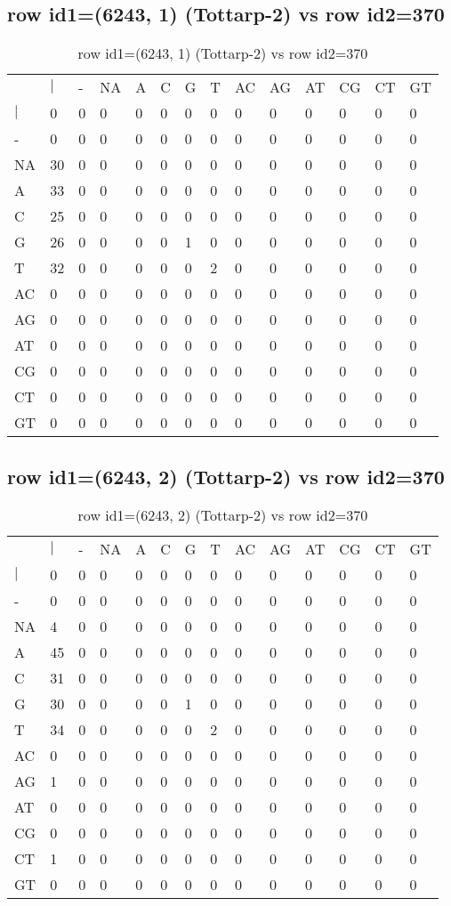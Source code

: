 \subsection{row id1=(6243, 1) (Tottarp-2) vs row id2=370}
\begin{center}
\begin{longtable}{|l|l|l|l|l|l|l|l|l|l|l|l|l|l|}
\caption{row id1=(6243, 1) (Tottarp-2) vs row id2=370} \label{table_dm52}\\
\hline
\\
\hline
&$|$&-&NA&A&C&G&T&AC&AG&AT&CG&CT&GT\\
$|$&0&0&0&0&0&0&0&0&0&0&0&0&0\\
-&0&0&0&0&0&0&0&0&0&0&0&0&0\\
NA&30&0&0&0&0&0&0&0&0&0&0&0&0\\
A&33&0&0&0&0&0&0&0&0&0&0&0&0\\
C&25&0&0&0&0&0&0&0&0&0&0&0&0\\
G&26&0&0&0&0&1&0&0&0&0&0&0&0\\
T&32&0&0&0&0&0&2&0&0&0&0&0&0\\
AC&0&0&0&0&0&0&0&0&0&0&0&0&0\\
AG&0&0&0&0&0&0&0&0&0&0&0&0&0\\
AT&0&0&0&0&0&0&0&0&0&0&0&0&0\\
CG&0&0&0&0&0&0&0&0&0&0&0&0&0\\
CT&0&0&0&0&0&0&0&0&0&0&0&0&0\\
GT&0&0&0&0&0&0&0&0&0&0&0&0&0\\
\hline
\end{longtable}
\end{center}

\subsection{row id1=(6243, 2) (Tottarp-2) vs row id2=370}
\begin{center}
\begin{longtable}{|l|l|l|l|l|l|l|l|l|l|l|l|l|l|}
\caption{row id1=(6243, 2) (Tottarp-2) vs row id2=370} \label{table_dm54}\\
\hline
\\
\hline
&$|$&-&NA&A&C&G&T&AC&AG&AT&CG&CT&GT\\
$|$&0&0&0&0&0&0&0&0&0&0&0&0&0\\
-&0&0&0&0&0&0&0&0&0&0&0&0&0\\
NA&4&0&0&0&0&0&0&0&0&0&0&0&0\\
A&45&0&0&0&0&0&0&0&0&0&0&0&0\\
C&31&0&0&0&0&0&0&0&0&0&0&0&0\\
G&30&0&0&0&0&1&0&0&0&0&0&0&0\\
T&34&0&0&0&0&0&2&0&0&0&0&0&0\\
AC&0&0&0&0&0&0&0&0&0&0&0&0&0\\
AG&1&0&0&0&0&0&0&0&0&0&0&0&0\\
AT&0&0&0&0&0&0&0&0&0&0&0&0&0\\
CG&0&0&0&0&0&0&0&0&0&0&0&0&0\\
CT&1&0&0&0&0&0&0&0&0&0&0&0&0\\
GT&0&0&0&0&0&0&0&0&0&0&0&0&0\\
\hline
\end{longtable}
\end{center}

